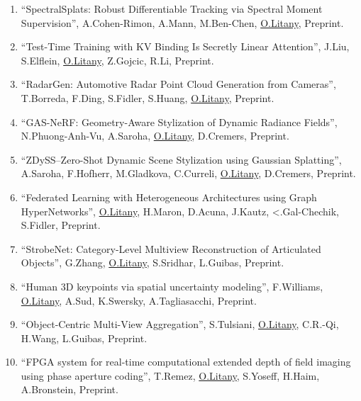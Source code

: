 \begin{enumerate}

\item ``SpectralSplats: Robust Differentiable Tracking via Spectral Moment Supervision'', A.Cohen-Rimon, A.Mann, M.Ben-Chen, \underline{O.Litany}, Preprint.

\item ``Test-Time Training with KV Binding Is Secretly Linear Attention'', J.Liu, S.Elflein, \underline{O.Litany}, Z.Gojcic, R.Li, Preprint.

\item ``RadarGen: Automotive Radar Point Cloud Generation from Cameras'', T.Borreda, F.Ding, S.Fidler, S.Huang, \underline{O.Litany}, Preprint.

\item ``GAS-NeRF: Geometry-Aware Stylization of Dynamic Radiance Fields'', N.Phuong-Anh-Vu, A.Saroha, \underline{O.Litany}, D.Cremers, Preprint.

\item ``ZDySS--Zero-Shot Dynamic Scene Stylization using Gaussian Splatting'', A.Saroha, F.Hofherr, M.Gladkova, C.Curreli, \underline{O.Litany}, D.Cremers, Preprint.

\item ``Federated Learning with Heterogeneous Architectures using Graph HyperNetworks'', \underline{O.Litany}, H.Maron, D.Acuna, J.Kautz, <.Gal-Chechik, S.Fidler, Preprint.

\item ``StrobeNet: Category-Level Multiview Reconstruction of Articulated Objects'', G.Zhang, \underline{O.Litany}, S.Sridhar, L.Guibas, Preprint.

\item ``Human 3D keypoints via spatial uncertainty modeling'', F.Williams, \underline{O.Litany}, A.Sud, K.Swersky, A.Tagliasacchi, Preprint.

\item ``Object-Centric Multi-View Aggregation'', S.Tulsiani, \underline{O.Litany}, C.R.-Qi, H.Wang, L.Guibas, Preprint.

\item ``FPGA system for real-time computational extended depth of field imaging using phase aperture coding'', T.Remez, \underline{O.Litany}, S.Yoseff, H.Haim, A.Bronstein, Preprint.

\end{enumerate}